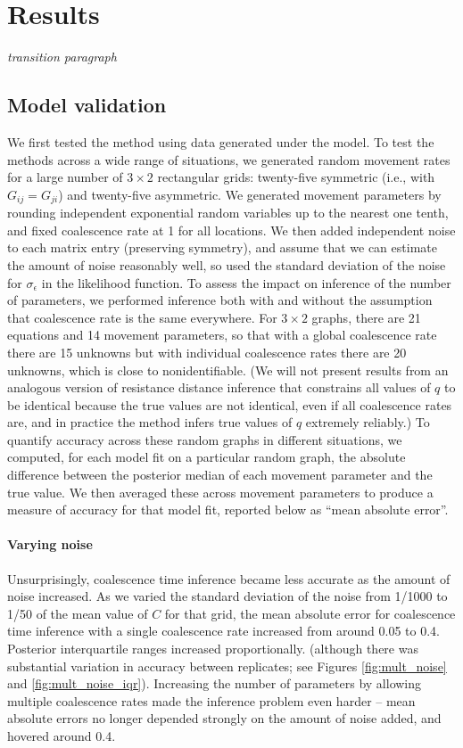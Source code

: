 \documentclass{article}
\newcommand{\plr}[1]{{\em \color{blue} #1}}
\begin{document}
\section*{Results}

\plr{transition paragraph}


\subsection*{Model validation}

We first tested the method using data generated under the model.
To test the methods across a wide range of situations,
we generated random movement rates for 
a large number of $3 \times 2$ rectangular grids:
twenty-five symmetric (i.e., with $G_{ij} = G_{ji}$) and twenty-five asymmetric.
We generated movement parameters
by rounding independent exponential random variables up to the nearest one tenth,
and fixed coalescence rate at 1 for all locations.
We then added independent noise to each matrix entry (preserving symmetry),
and assume that we can estimate the amount of noise reasonably well, 
so used the standard deviation of the noise for $\sigma_\epsilon$ in the likelihood function.
To assess the impact on inference of the number of parameters,
we performed inference both with and without the assumption 
that coalescence rate is the same everywhere.
For $3 \times 2$ graphs, there are 21 equations
and 14 movement parameters,
so that with a global coalescence rate there are 15 unknowns
but with individual coalescence rates there are 20 unknowns,
which is close to nonidentifiable.
(We will not present results from an analogous version of resistance distance inference
that constrains all values of $q$ to be identical
because the true values are not identical, even if all coalescence rates are,
and in practice the method infers true values of $q$ extremely reliably.)
To quantify accuracy across these random graphs in different situations,
we computed, for each model fit on a particular random graph,
the absolute difference between the posterior median of each movement parameter
and the true value.
We then averaged these across movement parameters to produce a measure of accuracy for that model fit,
reported below as ``mean absolute error''.


\paragraph{Varying noise}
Unsurprisingly, coalescence time inference became less accurate as the amount of noise increased.
As we varied the standard deviation of the noise
from 1/1000 to 1/50 of the mean value of $C$ for that grid,
the mean absolute error 
for coalescence time inference with a single coalescence rate
increased from around 0.05 to 0.4.
Posterior interquartile ranges increased proportionally.
(although there was substantial variation in accuracy between replicates;
see Figures \ref{fig:mult_noise} and \ref{fig:mult_noise_iqr}).
Increasing the number of parameters by allowing multiple coalescence rates
made the inference problem even harder --
mean absolute errors no longer depended strongly on the amount of noise added,
and hovered around 0.4.
\end{document}
